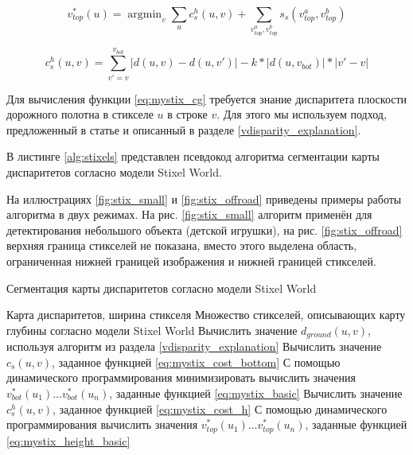\documentclass[aps,%
14pt,%
final,%
oneside,
onecolumn,%
musixtex, %
superscriptaddress,%
centertags]{extarticle} %
\DeclareMathOperator*{\argmin}{argmin}
\begin{document}
\begin{equation}\label{eq:mystix_height_basic}
v_{top}^*(u) = \argmin_{v}\sum_u c_s^h(u, v) + \sum_{v_{top}^a, v_{top}^b} s_s(v_{top}^a, v_{top}^b)
\end{equation}

\begin{equation}\label{eq:mystix_cost_h}
c_s^h(u, v) = \sum_{v'=v}^{v_{bot}} |d(u, v) - d(u, v')| - k * |d(u, v_{bot})| * |v' - v|
\end{equation}

Для вычисления функции \ref{eq:mystix_cg} требуется знание диспаритета плоскости дорожного полотна в стикселе $u$ в строке $v$. Для этого мы используем подход, предложенный в статье \cite{labayrade2002real} и описанный в разделе \ref{vdisparity_explanation}.

В листинге \ref{alg:stixels} представлен псевдокод алгоритма сегментации карты диспаритетов согласно модели Stixel World.

На иллюстрациях \ref{fig:stix_small} и \ref{fig:stix_offroad} приведены примеры работы алгоритма в двух режимах. На рис. \ref{fig:stix_small} алгоритм применён для детектирования небольшого объекта (детской игрушки), на рис. \ref{fig:stix_offroad} верхняя граница стикселей не показана, вместо этого выделена область, ограниченная нижней границей изображения и нижней границей стикселей.



\begin{algorithm}[H]
\caption{Сегментация карты диспаритетов согласно модели Stixel World}
\label{alg:stixels}
\begin{algorithmic}[1]
\Require Карта диспаритетов, ширина стикселя
\Ensure Множество стикселей, описывающих карту глубины согласно модели Stixel World
\State Вычислить значение $d_{ground}(u, v)$, используя алгоритм из раздела \ref{vdisparity_explanation}
\State Вычислить значение $c_s(u, v)$, заданное функцией \ref{eq:mystix_cost_bottom}
\EndFor
\State С помощью динамического программирования минимизировать вычислить значения $v_{bot}^*(u_1) \dots v_{bot}^*(u_n)$, заданные функцией \ref{eq:mystix_basic}
\State Вычислить значение $c_s^h(u, v)$, заданное функцией \ref{eq:mystix_cost_h}
\EndFor
\State С помощью динамического программирования вычислить значения $v_{top}^*(u_1) \dots v_{top}^*(u_n)$, заданные функцией \ref{eq:mystix_height_basic}
\end{algorithmic}
\end{algorithm}
\end{document}
